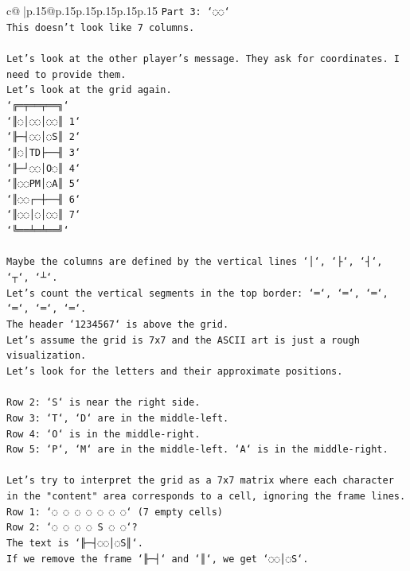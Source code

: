 \documentclass{article}
\begin{document}
{\begin{supertabular}{c@{$\;$}|p{.15\linewidth}@{}p{.15\linewidth}p{.15\linewidth}p{.15\linewidth}p{.15\linewidth}p{.15\linewidth}}
{{{\texttt{Part 3: `◌◌`} \\
\texttt{This doesn't look like 7 columns.} \\
\\ 
\texttt{Let's look at the other player's message. They ask for coordinates. I need to provide them.} \\
\texttt{Let's look at the grid again.} \\
\texttt{`╔═╤══╤══╗`} \\
\texttt{`║◌│◌◌│◌◌║ 1`} \\
\texttt{`╟─┤◌◌│◌S║ 2`} \\
\texttt{`║◌│TD├──╢ 3`} \\
\texttt{`╟─┘◌◌│O◌║ 4`} \\
\texttt{`║◌◌PM│◌A║ 5`} \\
\texttt{`║◌◌┌─┼──╢ 6`} \\
\texttt{`║◌◌│◌│◌◌║ 7`} \\
\texttt{`╚══╧═╧══╝`} \\
\\ 
\texttt{Maybe the columns are defined by the vertical lines `│`, `├`, `┤`, `┬`, `┴`.} \\
\texttt{Let's count the vertical segments in the top border: `═`, `═`, `═`, `═`, `═`, `═`.} \\
\texttt{The header `1234567` is above the grid.} \\
\texttt{Let's assume the grid is 7x7 and the ASCII art is just a rough visualization.} \\
\texttt{Let's look for the letters and their approximate positions.} \\
\\ 
\texttt{Row 2: `S` is near the right side.} \\
\texttt{Row 3: `T`, `D` are in the middle{-}left.} \\
\texttt{Row 4: `O` is in the middle{-}right.} \\
\texttt{Row 5: `P`, `M` are in the middle{-}left. `A` is in the middle{-}right.} \\
\\ 
\texttt{Let's try to interpret the grid as a 7x7 matrix where each character in the "content" area corresponds to a cell, ignoring the frame lines.} \\
\texttt{Row 1: `◌ ◌ ◌ ◌ ◌ ◌ ◌` (7 empty cells)} \\
\texttt{Row 2: `◌ ◌ ◌ ◌ S ◌ ◌`?} \\
\texttt{The text is `╟─┤◌◌│◌S║`.} \\
\texttt{If we remove the frame `╟─┤` and `║`, we get `◌◌│◌S`.} \\
}}}
\end{supertabular}}
\end{document}
